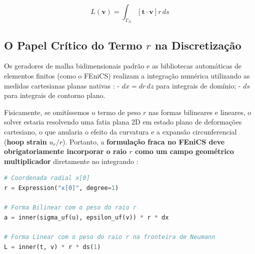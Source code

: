 \begin{equation}
  L(\mathbf{v}) = \int_{\Gamma_N} \left[ \mathbf{t} \cdot \mathbf{v} \right] r \, d s
  \label{eq:linear_form}
\end{equation}

\subsection{O Papel Crítico do Termo $r$ na Discretização}

Os geradores de malha bidimensionais padrão e as bibliotecas automáticas de elementos finitos (como o FEniCS) realizam a integração numérica utilizando as medidas cartesianas planas nativas \cite{logg2012automated}:
- $dx = dr \, dz$ para integrais de domínio;
- $ds$ para integrais de contorno plano.

Fisicamente, se omitíssemos o termo de peso $r$ nas formas bilineares e lineares, o solver estaria resolvendo uma fatia plana 2D em estado plano de deformações cartesiano, o que anularia o efeito da curvatura e a expansão circunferencial (\textbf{hoop strain} $u_r/r$). Portanto, a \textbf{formulação fraca no FEniCS deve obrigatoriamente incorporar o raio $r$ como um campo geométrico multiplicador} diretamente no integrando \cite{logg2012automated}:

\begin{lstlisting}[language=Python, caption={Implementação conceitual da forma fraca no FEniCS (UFL).}]
# Coordenada radial x[0]
r = Expression("x[0]", degree=1) 

# Forma Bilinear com o peso do raio r
a = inner(sigma_uf(u), epsilon_uf(v)) * r * dx

# Forma Linear com o peso do raio r na fronteira de Neumann
L = inner(t, v) * r * ds(1)
\end{lstlisting}


